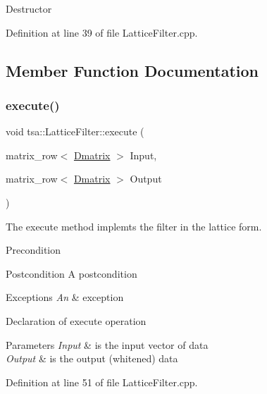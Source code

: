 Destructor 

Definition at line 39 of file Lattice\+Filter.\+cpp.



\subsection{Member Function Documentation}
\mbox{\label{classtsa_1_1_lattice_filter_a09ebe977a54eed4453db605ab742f771}} 
\subsubsection{\texorpdfstring{execute()}{execute()}}
{\footnotesize\ttfamily void tsa\+::\+Lattice\+Filter\+::execute (\begin{DoxyParamCaption}\item[{matrix\+\_\+row$<$ \hyperlink{namespacetsa_ad260cd21c1891c4ed391fe788569aba4}{Dmatrix} $>$}]{Input,  }\item[{matrix\+\_\+row$<$ \hyperlink{namespacetsa_ad260cd21c1891c4ed391fe788569aba4}{Dmatrix} $>$}]{Output }\end{DoxyParamCaption})}



The execute method implemts the filter in the lattice form. 

\begin{DoxyPrecond}{Precondition}

\end{DoxyPrecond}
\begin{DoxyPostcond}{Postcondition}
A postcondition 
\end{DoxyPostcond}

\begin{DoxyExceptions}{Exceptions}
{\em An} & exception\\
\hline
\end{DoxyExceptions}
Declaration of execute operation


\begin{DoxyParams}{Parameters}
{\em Input} & is the input vector of data \\
\hline
{\em Output} & is the output (whitened) data \\
\hline
\end{DoxyParams}


Definition at line 51 of file Lattice\+Filter.\+cpp.

